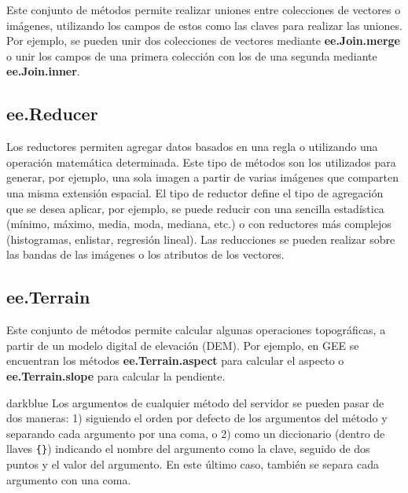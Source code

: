\documentclass[
  12pt,
  letterpaper,
  twoside]{book}
\newcommand\boldpurple[1]{\textcolor{darkpurple}{\textbf{#1}}}
\begin{document}
Este conjunto de métodos permite realizar uniones entre colecciones de vectores o imágenes, utilizando los campos de estos como las claves para realizar las uniones. Por ejemplo, se pueden unir dos colecciones de vectores mediante \boldpurple{ee.Join.merge} o unir los campos de una primera colección con los de una segunda mediante \boldpurple{ee.Join.inner}.

\hypertarget{ee.reducer}{%
\subsection*{ee.Reducer}\label{ee.reducer}}

Los reductores permiten agregar datos basados en una regla o utilizando una operación matemática determinada. Este tipo de métodos son los utilizados para generar, por ejemplo, una sola imagen a partir de varias imágenes que comparten una misma extensión espacial. El tipo de reductor define el tipo de agregación que se desea aplicar, por ejemplo, se puede reducir con una sencilla estadística (mínimo, máximo, media, moda, mediana, etc.) o con reductores más complejos (histogramas, enlistar, regresión lineal). Las reducciones se pueden realizar sobre las bandas de las imágenes o los atributos de los vectores.

\hypertarget{ee.terrain}{%
\subsection*{ee.Terrain}\label{ee.terrain}}

Este conjunto de métodos permite calcular algunas operaciones topográficas, a partir de un modelo digital de elevación (DEM). Por ejemplo, en GEE se encuentran los métodos \boldpurple{ee.Terrain.aspect} para calcular el aspecto o \boldpurple{ee.Terrain.slope} para calcular la pendiente.

\begin{bluebox2}

\begin{awesomeblock}{5pt}{\faLightbulb}{darkblue}
Los argumentos de cualquier método del servidor se pueden pasar de dos maneras: 1) siguiendo el orden por defecto de los argumentos del método y separando cada argumento por una coma, o 2) como un diccionario (dentro de llaves \texttt{\{\}}) indicando el nombre del argumento como la clave, seguido de dos puntos y el valor del argumento. En este último caso, también se separa cada argumento con una coma.

\end{awesomeblock}

\end{bluebox2}
\end{document}
